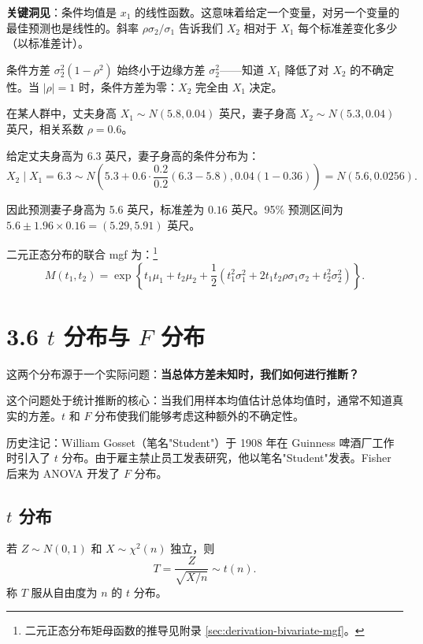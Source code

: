 \textbf{关键洞见}：条件均值是 $x_1$ 的线性函数。这意味着给定一个变量，对另一个变量的最佳预测也是线性的。斜率 $\rho\sigma_2/\sigma_1$ 告诉我们 $X_2$ 相对于 $X_1$ 每个标准差变化多少（以标准差计）。

条件方差 $\sigma_2^{2}(1-\rho^{2})$ 始终小于边缘方差 $\sigma_2^{2}$——知道 $X_1$ 降低了对 $X_2$ 的不确定性。当 $|\rho| = 1$ 时，条件方差为零：$X_2$ 完全由 $X_1$ 决定。

\begin{example}[夫妻身高]\label{ex:height-correlation-ch3}
在某人群中，丈夫身高 $X_1 \sim N(5.8, 0.04)$ 英尺，妻子身高 $X_2 \sim N(5.3, 0.04)$ 英尺，相关系数 $\rho = 0.6$。

给定丈夫身高为 6.3 英尺，妻子身高的条件分布为：
\[
X_2 \mid X_1 = 6.3 \sim N\left(5.3 + 0.6 \cdot \frac{0.2}{0.2}(6.3-5.8), 0.04(1-0.36)\right) = N(5.6, 0.0256).
\]

因此预测妻子身高为 5.6 英尺，标准差为 $0.16$ 英尺。95\% 预测区间为 $5.6 \pm 1.96 \times 0.16 = (5.29, 5.91)$ 英尺。
\end{example}

二元正态分布的联合 mgf 为：\footnote{二元正态分布矩母函数的推导见附录 \cref{sec:derivation-bivariate-mgf}。}
\[
M(t_1, t_2) = \exp\left\{ t_1\mu_1 + t_2\mu_2 + \frac{1}{2}(t_1^{2}\sigma_1^{2} + 2t_1 t_2 \rho\sigma_1\sigma_2 + t_2^{2}\sigma_2^{2}) \right\}.
\label{eq:bivariate-normal-mgf-ch3}
\]

\section{3.6 $t$ 分布与 $F$ 分布}\label{sec:t-f-distributions-ch3}

这两个分布源于一个实际问题：\textbf{当总体方差未知时，我们如何进行推断？}

这个问题处于统计推断的核心：当我们用样本均值估计总体均值时，通常不知道真实的方差。$t$ 和 $F$ 分布使我们能够考虑这种额外的不确定性。

历史注记：William Gosset（笔名"Student"）于 1908 年在 Guinness 啤酒厂工作时引入了 $t$ 分布。由于雇主禁止员工发表研究，他以笔名"Student"发表。Fisher 后来为 ANOVA 开发了 $F$ 分布。

\subsection{$t$ 分布}\label{sub:t-distribution-ch3}

\begin{definition}[$t$ 分布]\label{def:t-distribution-ch3}
若 $Z \sim N(0,1)$ 和 $X \sim \chi^{2}(n)$ 独立，则
\[
T = \frac{Z}{\sqrt{X/n}} \sim t(n).
\label{eq:t-distribution-ch3}
\]
称 $T$ 服从自由度为 $n$ 的 $t$ 分布。
\end{definition}

